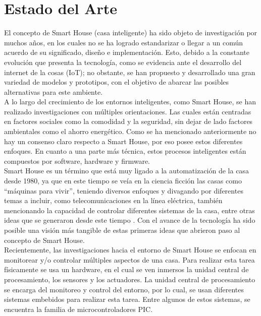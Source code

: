 \chapter{Estado del Arte}

El concepto de Smart House (casa inteligente) ha sido objeto de investigación por muchos años, en los cuales no se ha logrado estandarizar o llegar a un común acuerdo de su significado, diseño e implementación. Esto, debido a la constante evolución que presenta la tecnología, como se evidencia ante el desarrollo del internet de la cosas (IoT); no obstante, se han propuesto y desarrollado una gran variedad de modelos y prototipos, con el objetivo de abarcar las posibles alternativas para este ambiente. \\

A lo largo del crecimiento de los entornos inteligentes, como Smart House, se han realizado investigaciones con múltiples orientaciones. Las cuales están centradas en factores sociales como la comodidad y la seguridad, sin dejar de lado factores ambientales como el ahorro energético. Como se ha mencionado anteriormente no hay un consenso claro respecto a Smart House, por eso posee estos diferentes enfoques. En cuanto a una parte más técnica, estos procesos inteligentes están compuestos por software, hardware y firmware.\\

Smart House es un término que está muy ligado a la automatización de la casa desde 1980, ya que en este tiempo se veía en la ciencia ficción las casas como “máquinas para vivir”, teniendo diversos enfoques y divagando por diferentes temas a incluir, como telecomunicaciones en la línea eléctrica, también mencionando la capacidad de controlar diferentes sistemas de la casa, entre otras ideas que se generaron desde este tiempo \cite{Gross1998}. Con el avance de la tecnología ha sido posible una visión más tangible de estas primeras ideas que abrieron paso al concepto de Smart House.\\

Recientemente, las investigaciones hacia el entorno de Smart House se enfocan en monitorear y/o controlar múltiples aspectos de una casa. Para realizar esta tarea físicamente se usa un hardware, en el cual se ven inmersos la unidad central de procesamiento, los sensores y los actuadores. La unidad central de procesamiento se encarga del monitoreo y control del entorno, por lo cual, se usan diferentes sistemas embebidos para realizar esta tarea. Entre algunos de estos sistemas, se encuentra la familia de microcontroladores PIC.\\

